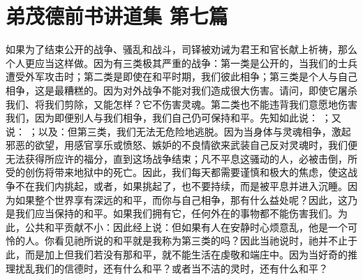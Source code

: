

\section{弟茂德前书讲道集 第七篇}

\par

\par

如果为了结束公开的战争、骚乱和战斗，司铎被劝诫为君王和官长献上祈祷，那么个人更应当这样做。因为有三类极其严重的战争：第一类是公开的，当我们的士兵遭受外军攻击时；第二类是即使在和平时期，我们彼此相争；第三类是个人与自己相争，这是最糟糕的。因为对外战争不能对我们造成很大伤害。请问，即使它屠杀我们、将我们剪除，又能怎样？它不伤害灵魂。第二类也不能违背我们意愿地伤害我们，因为即便别人与我们相争，我们自己仍可保持和平。先知如此说： ；又说： ；以及：但第三类，我们无法无危险地逃脱。因为当身体与灵魂相争，激起邪恶的欲望，用感官享乐或愤怒、嫉妒的不良情欲来武装自己反对灵魂时，我们便无法获得所应许的福分，直到这场战争结束；凡不平息这骚动的人，必被击倒，所受的创伤将带来地狱中的死亡。因此，我们每天都需要谨慎和极大的焦虑，使这战争不在我们内挑起，或者，如果挑起了，也不要持续，而是被平息并进入沉睡。因为如果整个世界享有深远的和平，而你与自己相争，那有什么益处呢？因此，这乃是我们应当保持的和平。如果我们拥有它，任何外在的事物都不能伤害我们。为此，公共和平贡献不小：因此经上说：但如果有人在安静时心烦意乱，他是一个可怜的人。你看见祂所说的和平就是我称为第三类的吗？因此当祂说时，祂并不止于此，而是加上但我们若没有那和平，就不能生活在虔敬和端庄中。因为当好奇的推理扰乱我们的信德时，还有什么和平？或者当不洁的灵时，还有什么和平？\par


